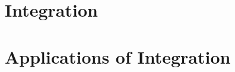\documentclass[12pt,a4paper,oneside]{report}
\begin{document}
\chapter{Integration}
\makenewpage
\makenewpage
\makenewpage
\makenewpage
\makenewpage
\makenewpage

\chapter{Applications of Integration}
\makenewpage
\makenewpage
\makenewpage
\makenewpage

\backmatter
\appendix
\ifincludepastyears
  
\fi


\end{document}
